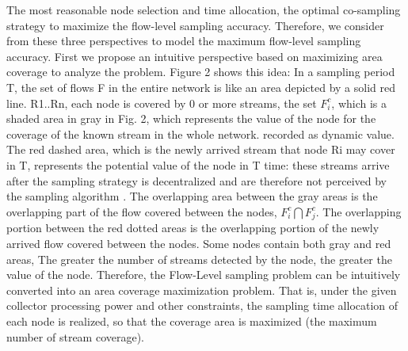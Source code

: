 \documentclass[conference,compsoc]{IEEEtran}
\begin{document}
The most reasonable node selection and time allocation, the optimal co-sampling strategy to maximize the flow-level sampling accuracy. Therefore, we consider from these three perspectives to model the maximum flow-level sampling accuracy. First we propose an intuitive perspective based on maximizing area coverage to analyze the problem. Figure 2 shows this idea: In a sampling period T, the set of flows F in the entire network is like an area depicted by a solid red line. R1..Rn, each node is covered by 0 or more streams, the set $F_i^c$, which is a shaded area in gray in Fig. 2, which represents the value of the node for the coverage of the known stream in the whole network. recorded as dynamic value. The red dashed area, which is the newly arrived stream that node Ri may cover in T, represents the potential value of the node in T time: these streams arrive after the sampling strategy is decentralized and are therefore not perceived by the sampling algorithm . The overlapping area between the gray areas is the overlapping part of the flow covered between the nodes, $F_i^c \bigcap F_j^c$. The overlapping portion between the red dotted areas is the overlapping portion of the newly arrived flow covered between the nodes. Some nodes contain both gray and red areas, The greater the number of streams detected by the node, the greater the value of the node. Therefore, the Flow-Level sampling problem can be intuitively converted into an area coverage maximization problem. That is, under the given collector processing power and other constraints, the sampling time allocation of each node is realized, so that the coverage area is maximized (the maximum number of stream coverage).
\end{document}
